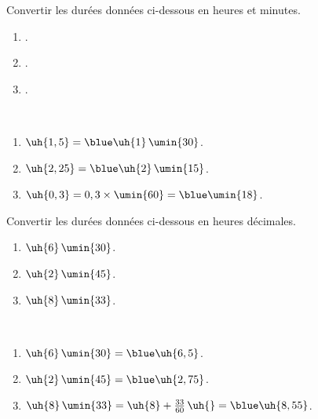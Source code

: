 \exercicesbase

\begin{colonne*exercice}

\begin{exercice} %
   Convertir les durées données ci-dessous en heures et minutes.
   \begin{enumerate}
      \item {}.
      \item {}.
      \item {}.
   \end{enumerate}
\end{exercice}

\begin{corrige}
   \ \\ [-5mm]
   \begin{enumerate}
      \item $\uh{1,5} =\blue \uh{1}\,\umin{30}$.
      \item $\uh{2,25} =\blue \uh{2}\,\umin{15}$.
      \item $\uh{0,3} =0,3\times\umin{60} =\blue \umin{18}$.
   \end{enumerate}
\end{corrige}

\bigskip


\begin{exercice} %
   Convertir les durées données ci-dessous en heures décimales.
   \begin{enumerate}
      \item $\uh{6}\,\umin{30}$.
      \item $\uh{2}\,\umin{45}$.
      \item $\uh{8}\,\umin{33}$.
   \end{enumerate}
\end{exercice}

\begin{corrige}
   \ \\ [-5mm]
   \begin{enumerate}
      \item $\uh{6}\,\umin{30} =\blue \uh{6,5}$.
      \item $\uh{2}\,\umin{45} =\blue \uh{2,75}$. \smallskip
      \item $\uh{8}\,\umin{33} =\uh{8}+\frac{33}{60}\,\uh{} =\blue \uh{8,55}$.
   \end{enumerate}
\end{corrige}


\end{colonne*exercice}
